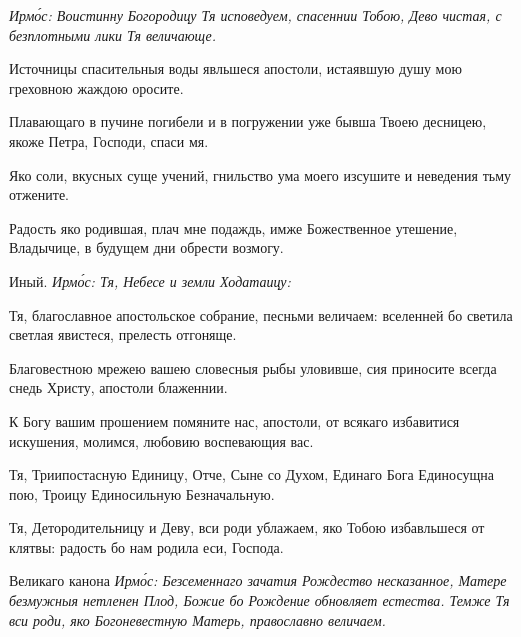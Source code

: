 \itshape Ирм\'{о}с\normalfont{}: Воистинну Богородицу Тя исповедуем, спасеннии Тобою, Дево чистая, с безплотными лики Тя величающе.


Источницы спасительныя воды явльшеся апостоли, истаявшую душу мою греховною жаждою оросите.


Плавающаго в пучине погибели и в погружении уже бывша Твоею десницею, якоже Петра, Господи, спаси мя.


Яко соли, вкусных суще учений, гнильство ума моего изсушите и неведения тьму отжените.


Радость яко родившая, плач мне подаждь, имже Божественное утешение, Владычице, в будущем дни обрести возмогу.

Иный. \itshape Ирм\'{о}с\normalfont{}: Тя, Небесе и земли Ходатаицу:


Тя, благославное апостольское собрание, песньми величаем: вселенней бо светила светлая явистеся, прелесть отгоняще.


Благовестною мрежею вашею словесныя рыбы уловивше, сия приносите всегда снедь Христу, апостоли блаженнии.


К Богу вашим прошением помяните нас, апостоли, от всякаго избавитися искушения, молимся, любовию воспевающия вас.


Тя, Триипостасную Единицу, Отче, Сыне со Духом, Единаго Бога Единосущна пою, Троицу Единосильную Безначальную.


Тя, Детородительницу и Деву, вси роди ублажаем, яко Тобою избавльшеся от клятвы: радость бо нам родила еси, Господа.

Великаго канона \itshape Ирм\'{о}с\normalfont{}: Безсеменнаго зачатия Рождество несказанное, Матере безмужныя нетленен Плод, Божие бо Рождение обновляет естества. Темже Тя вси роди, яко Богоневестную Матерь, православно величаем.

